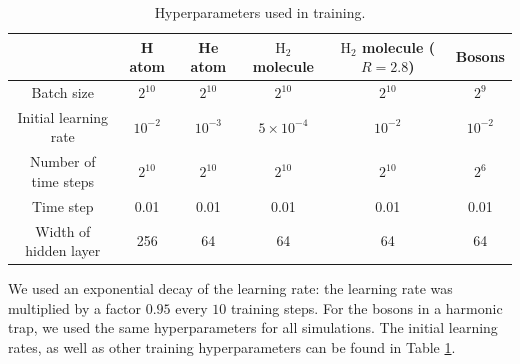 \documentclass[12pt]{msml2020} %
\begin{document}
\begin{table}[]
    \centering
    \begin{tabular}{ c | c c c c c} 
                    & H atom    & He atom   & $\text{H}_2$ molecule & $\text{H}_2$ molecule ($R=2.8$) & Bosons\\
 \hline
 Batch size     & $2^{10}$        & $2^{10}$    &  $2^{10}$   &  $2^{10}$ & $2^{9}$\\
 Initial learning rate  & $10^{-2}$ & $10^{-3}$ & $5 \times 10^{-4}$ & $10^{-2}$ & $10^{-2}$ \\
 Number of time steps    & $2^{10}$ & $2^{10}$ & $2^{10}$ & $2^{10}$ & $2^{6}$\\
 Time step   & 0.01 & 0.01 & 0.01 & 0.01 & 0.01\\
 Width of hidden layer  & 256 & 64 & 64 & 64 & 64
\end{tabular}

    \caption{Hyperparameters used in training.     \label{tab:hyperparameters} }
\end{table}

We used an exponential decay of the learning rate: the learning rate was multiplied by a factor $0.95$ every $10$ training steps. For the bosons in a harmonic trap, we used the same hyperparameters for all simulations. The initial learning rates, as well as other training hyperparameters can be found in Table \ref{tab:hyperparameters}.




\end{document}

